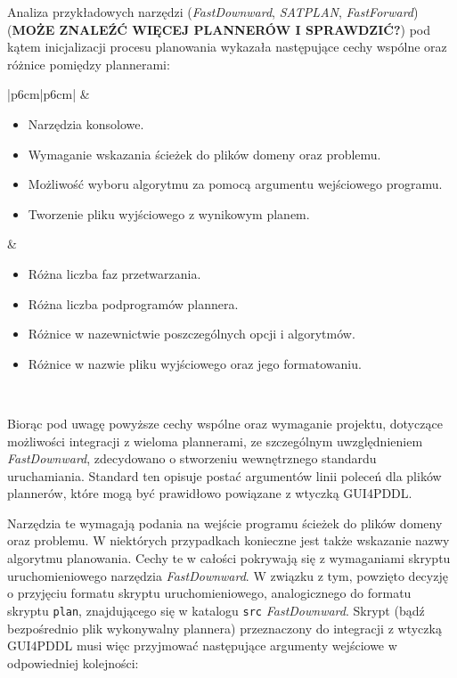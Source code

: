 Analiza przykładowych narzędzi (\textit{FastDownward}, \textit{SATPLAN}, \textit{FastForward})(\textbf{MOŻE ZNALEŹĆ WIĘCEJ PLANNERÓW I SPRAWDZIĆ?}) pod kątem inicjalizacji procesu planowania wykazała następujące cechy wspólne oraz różnice pomiędzy plannerami:
\begin{table}[h]
\centering
\caption{Cechy wspólne oraz różnice w uruchamianiu pomiędzy przykładowymi plannerami.}
\label{plannersTable}
\begin{tabular}{|p{6cm}|p{6cm}|}
\hline
{} 
    &  
   \\
   \hline
\begin{itemize}
\item Narzędzia konsolowe.
\item Wymaganie wskazania ścieżek do plików domeny oraz problemu.
\item Możliwość wyboru algorytmu za pomocą argumentu wejściowego programu.
\item Tworzenie pliku wyjściowego z wynikowym planem.
\end{itemize}
&
\begin{itemize}
\item Różna liczba faz przetwarzania.
\item Różna liczba podprogramów plannera.
\item Różnice w nazewnictwie poszczególnych opcji i algorytmów.
\item Różnice w nazwie pliku wyjściowego oraz jego formatowaniu.
\end{itemize} \\
\hline
\end{tabular}
\end{table}

Biorąc pod uwagę powyższe cechy wspólne oraz wymaganie projektu, dotyczące możliwości integracji z wieloma plannerami, ze szczególnym uwzględnieniem \textit{FastDownward}, zdecydowano o stworzeniu wewnętrznego standardu uruchamiania. Standard ten opisuje postać argumentów linii poleceń dla plików plannerów, które mogą być prawidłowo powiązane z wtyczką GUI4PDDL. 

Narzędzia te wymagają podania na wejście programu ścieżek do plików domeny oraz problemu. W niektórych przypadkach konieczne jest także wskazanie nazwy algorytmu planowania. Cechy te w całości pokrywają się z wymaganiami skryptu uruchomieniowego narzędzia \textit{FastDownward}. W związku z tym, powzięto decyzję o przyjęciu formatu skryptu uruchomieniowego, analogicznego do formatu skryptu \texttt{plan}, znajdującego się w katalogu \texttt{src} \textit{FastDownward}. Skrypt (bądź bezpośrednio plik wykonywalny plannera) przeznaczony do integracji z wtyczką GUI4PDDL musi więc przyjmować następujące argumenty wejściowe w odpowiedniej kolejności:


